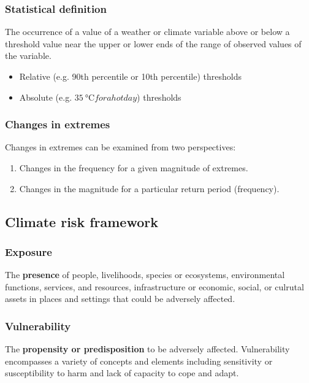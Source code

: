 \documentclass[11pt]{article}
\begin{document}
\subsubsection{Statistical definition}
\label{sec:orgb3f816d}
The occurrence of a value of a weather or climate variable above or below a threshold value near the upper or lower ends of the range of observed values of the variable.
\begin{itemize}
\item Relative (e.g. 90th percentile or 10th percentile) thresholds
\item Absolute (e.g. \(\qty{35}{\degreeCelsius} for a hot day\)) thresholds
\end{itemize}

\subsubsection{Changes in extremes}
\label{sec:org2550dce}
Changes in extremes can be examined from two perspectives:
\begin{enumerate}
\item Changes in the frequency for a given magnitude of extremes.
\item Changes in the magnitude for a particular return period (frequency).
\end{enumerate}

\subsection{Climate risk framework}
\label{sec:orgf7fc569}

\subsubsection{Exposure}
\label{sec:org503290c}
The \textbf{presence} of people, livelihoods, species or ecosystems, environmental functions, services, and resources, infrastructure or economic, social, or culrutal assets in places and settings that could be adversely affected.

\subsubsection{Vulnerability}
\label{sec:org586470c}
The \textbf{propensity or predisposition} to be adversely affected. Vulnerability encompasses a variety of concepts and elements including sensitivity or susceptibility to harm and lack of capacity to cope and adapt.
\end{document}
